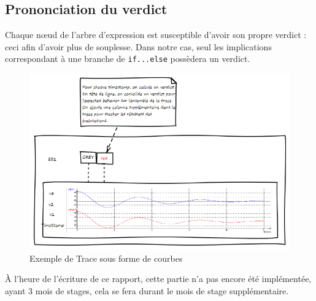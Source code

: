 	\subsection{Prononciation du verdict}
	Chaque n\oe{}ud de l'arbre d'expression est susceptible d'avoir son propre verdict : ceci afin d'avoir plus de souplesse. Dans notre cas, seul les implications correspondant à une branche de \texttt{if...else} possèdera un verdict.
\vfill~\vfill

	\begin{figure}[H]
		\centering
		\includegraphics[width=16cm]{contents/images/trace.png}
		\caption{Exemple de Trace sous forme de courbes}
	\end{figure}

	\begin{remarque}
	À l'heure de l'écriture de ce rapport, cette partie n'a pas encore été implémentée, ayant 3 mois de stages, cela se fera durant le mois de stage supplémentaire.
	\end{remarque}
